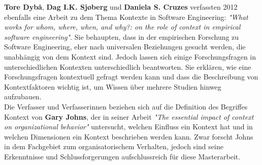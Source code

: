 \textbf{Tore Dyb\r{a}}, \textbf{Dag I.K. Sj\o{}berg} und \textbf{Daniela S. Cruzes} verfassten 2012 ebenfalls eine Arbeit zu dem Thema Kontexte in Software Engineering: \textit{"What works for whom, where, when, and why?: on the role of context in empirical software engineering"}. \cite{contextEmpiSE} Sie behaupten, dass in der empirischen Forschung zu Software Engineering, eher nach universalen Beziehungen gesucht werden, die unabhängig von dem Kontext sind. Jedoch lassen sich einige Forschungsfragen in unterschiedlichen Kontexten unterschiedlich beantworten. Sie erklären, wie eine Forschungsfragen kontextuell gefragt werden kann und dass die Beschreibung von Kontextfaktoren wichtig ist, um Wissen über mehrere Studien hinweg aufzubauen. \\
Die Verfasser und Verfasserinnen beziehen sich auf die Definition des Begriffes Kontext von \textbf{Gary Johns}, der in seiner Arbeit \textit{"The essential impact of context on organizational behavior"} untersucht, welchen Einfluss ein Kontext hat und in welchen Dimensionen ein Kontext beschrieben werden kann. \cite{impactContext}  Zwar forscht Johns in dem Fachgebiet zum organisatorischem Verhalten, jedoch sind seine Erkenntnisse und Schlussforgerungen aufschlussreich für diese Masterarbeit. \\
